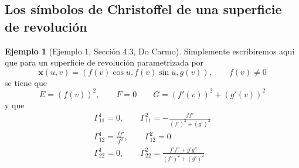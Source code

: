 \documentclass[spanish]{book}
\theoremstyle{definition}
\newtheorem*{ejem}{Ejemplo}
\begin{document}
\subsection{Los símbolos de Christoffel de una superficie de revolución}
\begin{ejem}[Ejemplo 1, Sección 4.3, Do Carmo]
	Simplemente escribiremos aquí que para un superficie de revolución parametrizada por
	\[\mathbf x(u,v)=(f(v)\cos u,f(v)\sin u,g(v)),\qquad f(v)\neq0\]
	se tiene que
	\[E=(f(v))^2,\qquad F=0\qquad G=(f'(v))^2+(g'(v))^2\]
	y que
	\begin{align*}
		\Gamma^1_{11}=0,\qquad\Gamma^2_{11}=-\frac{ff'}{(f')^2+(g')^2}\\
		\Gamma^1_{12}=\frac{ff'}{f^2},\qquad\Gamma^2_{12}=0\\
		\Gamma^1_{22}=0,\qquad\Gamma^2_{22}=\frac{f'f''+g'g''}{(f')^2+(g')^2}
	\end{align*}
\end{ejem}
\end{document}
